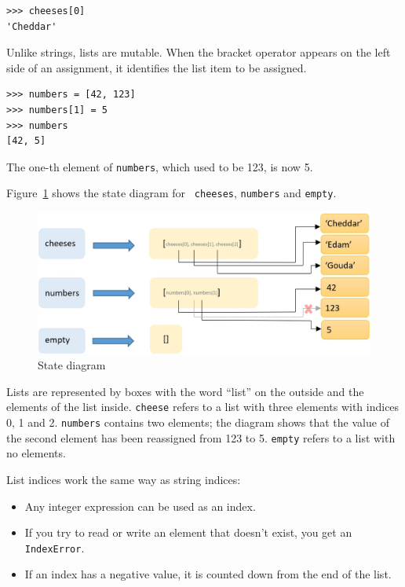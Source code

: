 \begin{Verbatim}[frame=single]
>>> cheeses[0]
'Cheddar'
\end{Verbatim}
%
Unlike strings, lists are mutable. When the bracket operator appears on the left side of an assignment, it identifies the list item to be assigned.

\begin{Verbatim}[frame=single]
>>> numbers = [42, 123]
>>> numbers[1] = 5
>>> numbers
[42, 5]
\end{Verbatim}
%
The one-th element of \texttt{numbers}, which used to be 123, is now 5.

Figure~\ref{fig.liststate} shows the state diagram for {\tt
cheeses}, \texttt{numbers} and \texttt{empty}.

\begin{figure}
\centerline
{\includegraphics[scale=0.45]{images/state-diagram.jpg}}
\caption{State diagram}
\label{fig.liststate}
\end{figure}

Lists are represented by boxes with the word ``list'' on the outside and the elements of the list inside. \texttt{cheese} refers to a list with three elements with indices 0, 1 and 2. \texttt{numbers} contains two elements; the diagram shows that the value of the second element has been reassigned from 123 to 5. \texttt{empty} refers to a list with no elements.

List indices work the same way as string indices:

\begin{itemize}

\item Any integer expression can be used as an index.

\item If you try to read or write an element that doesn't exist, you get an \texttt{IndexError}.

\item If an index has a negative value, it is counted down from the end of the list.

\end{itemize}

